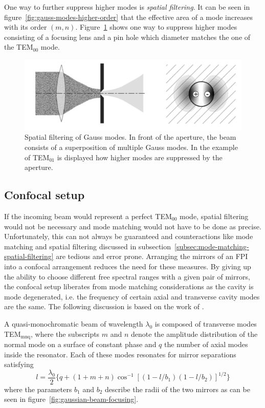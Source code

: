 One way to further suppress higher modes is \textit{spatial filtering}. It can be seen in figure~\ref{fig:gauss-modes-higher-order} that the effective area of a mode increases with its order $(m, n)$. Figure~\ref{fig:spatial-filtering-of-gauss-modes} shows one way to suppress higher modes consisting of a focusing lens and a pin hole which diameter matches the one of the TEM$_{00}$ mode.

\begin{figure}[H]
	\centering
	\includegraphics[width=0.8\linewidth]{figures/fabry-perot/spatial-filtering-of-gauss-modes}
	\caption[Spatial filtering of Gauss modes.]{Spatial filtering of Gauss modes.
		In front of the aperture, the beam consists of a superposition of multiple Gauss modes.
		In the example of TEM$_{01}$ is displayed how higher modes are suppressed by the aperture.~\cite{meschede_optik_2008}}
		\label{fig:spatial-filtering-of-gauss-modes}
	\end{figure}



\subsection{Confocal setup}
\label{subsec:confocal-setup}

If the incoming beam would represent a perfect TEM$_{00}$ mode, spatial filtering would not be necessary and mode matching would not have to be done as precise.
Unfortunately, this can not always be guaranteed and counteractions like mode matching and spatial filtering discussed in subsection~\ref{subsec:mode-matching-spatial-filtering} are tedious and error prone.
Arranging the mirrors of an \ac{FPI} into a confocal arrangement reduces the need for these measures.
By giving up the ability to choose different free spectral ranges with a given pair of mirrors, the confocal setup liberates from mode matching considerations as the cavity is mode degenerated, i.e. the frequency of certain axial and transverse cavity modes are the same.
The following discussion is based on the work of \textcite{hercher_spherical_1968}.

A quasi-monochromatic beam of wavelength $\lambda_0$ is composed of transverse modes TEM$_{\textrm{mnq}}$, where the subscripts $m$ and $n$ denote the amplitude distribution of the normal mode on a surface of constant phase and $q$ the number of axial modes inside the resonator.
Each of these modes resonates for mirror separations satisfying
\begin{equation}
l = \frac{\lambda_0}{2}\{q + \left(1 + m + n\right) \cos^{-1}\left[(1-l/b_1)(1-l/b_2)\right]^{1/2}\}
\end{equation}
where the parameters $b_1$ and $b_2$ describe the radii of the two mirrors as can be seen in figure~\ref{fig:gaussian-beam-focusing}.

